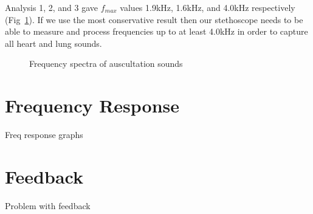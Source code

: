 Analysis 1, 2, and 3 gave $f_{max}$ values 1.9kHz, 1.6kHz, and 4.0kHz respectively (Fig~\ref{fig:ausc_spectra}). If we use the most conservative result then our stethoscope needs to be able to measure and process frequencies up to at least 4.0kHz in order to capture all heart and lung sounds.

\begin{figure}[htb]
	\centering
	\caption{Frequency spectra of auscultation sounds}
	\label{fig:ausc_spectra}
\end{figure}

\section{Frequency Response}
Freq response graphs

\section{Feedback} \label{feedback-freq}
Problem with feedback